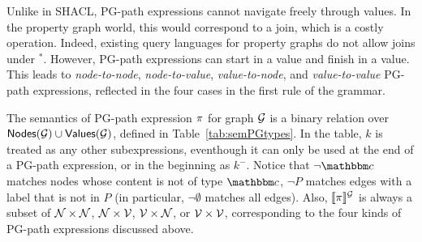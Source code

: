 
Unlike in SHACL, PG-path expressions cannot navigate freely through values. In the property graph world, this would correspond to a join, which is a costly operation. Indeed, existing query languages for property graphs do not allow joins under ${}^{*}$. However, PG-path expressions can start in a value and finish in a value. This leads to \emph{node-to-node}, \emph{node-to-value}, \emph{value-to-node}, and \emph{value-to-value} PG-path expressions, reflected in the four cases in the first rule of the grammar. 


The semantics of PG-path expression $\pi$ for graph $\mathcal{G}$ is a binary relation over
$\mathsf{Nodes}(\mathcal{G}) \cup \mathsf{Values}(\mathcal{G})$, defined in Table~\ref{tab:semPGtypes}. In the table, $k$ is treated as any other subexpressions, eventhough it can only be used at the end of a PG-path expression, or in the beginning as $k^{-}$.
Notice that $\lnot \ntype$ matches nodes whose content is not of type $\ntype$,  
$\lnot P$ matches edges with a label that is not in $P$ (in particular, $\lnot\emptyset$ matches all edges). 
Also, 
$\llbracket{\pi}\rrbracket^{\mathcal{G}}$ is always a subset of $\mathcal{N} \times \mathcal{N}$, $\mathcal{N} \times \mathcal{V}$, $\mathcal{V} \times \mathcal{N}$, or $\mathcal{V} \times \mathcal{V}$, corresponding to the four kinds of PG-path expressions discussed above.
 


